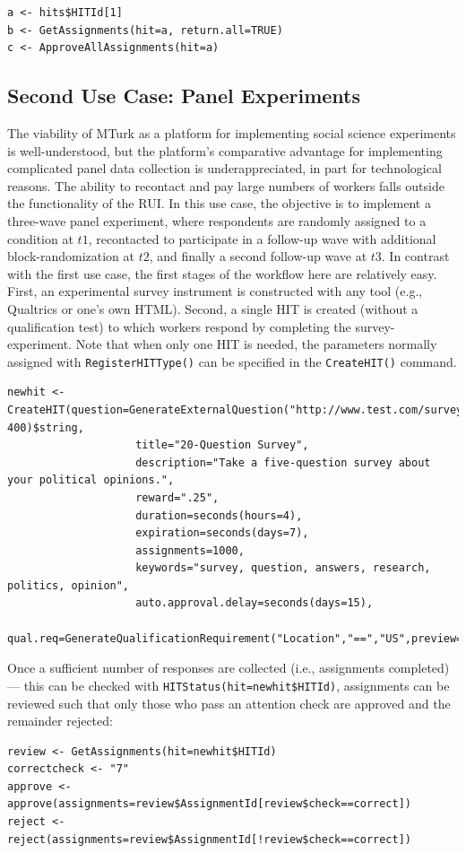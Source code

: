 \documentclass[11pt]{article}
\begin{document}
\begin{Verbatim}[fontsize=\footnotesize, xleftmargin=3mm]
a <- hits$HITId[1]
b <- GetAssignments(hit=a, return.all=TRUE)
c <- ApproveAllAssignments(hit=a)
\end{Verbatim}

\subsection{Second Use Case: Panel Experiments}

The viability of MTurk as a platform for implementing social science experiments is well-understood, but the platform's comparative advantage for implementing complicated panel data collection is underappreciated, in part for technological reasons. The ability to recontact and pay large numbers of workers falls outside the functionality of the RUI. In this use case, the objective is to implement a three-wave panel experiment, where respondents are randomly assigned to a condition at $t1$, recontacted to participate in a follow-up wave with additional block-randomization at $t2$, and finally a second follow-up wave at $t3$. In contrast with the first use case, the first stages of the workflow here are relatively easy. First, an experimental survey instrument is constructed with any tool (e.g., Qualtrics or one's own HTML). Second, a single HIT is created (without a qualification test) to which workers respond by completing the survey-experiment. Note that when only one HIT is needed, the parameters normally assigned with \verb|RegisterHITType()| can be specified in the \verb|CreateHIT()| command.

\begin{Verbatim}[fontsize=\footnotesize, xleftmargin=3mm]
newhit <- CreateHIT(question=GenerateExternalQuestion("http://www.test.com/surveylink", 400)$string,
                    title="20-Question Survey",
                    description="Take a five-question survey about your political opinions.",
                    reward=".25",
                    duration=seconds(hours=4),
                    expiration=seconds(days=7),
                    assignments=1000,
                    keywords="survey, question, answers, research, politics, opinion",
                    auto.approval.delay=seconds(days=15),
                    qual.req=GenerateQualificationRequirement("Location","==","US",preview=TRUE))
\end{Verbatim}

\noindent Once a sufficient number of responses are collected (i.e., assignments completed) --- this can be checked with \verb|HITStatus(hit=newhit$HITId)|, assignments can be reviewed such that only those who pass an attention check are approved and the remainder rejected:
\begin{Verbatim}[fontsize=\footnotesize, xleftmargin=3mm]
review <- GetAssignments(hit=newhit$HITId)
correctcheck <- "7"
approve <- approve(assignments=review$AssignmentId[review$check==correct])
reject <- reject(assignments=review$AssignmentId[!review$check==correct])
\end{Verbatim}
\end{document}
